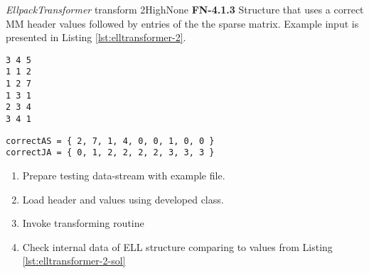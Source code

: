 \begin{testcase}{\emph{EllpackTransformer} transform 2}{High}{None}
	{
		\textbf{FN-4.1.3}
	}
	{
		Structure that uses a correct \gls{MM} header values followed by entries of the the sparse matrix. Example input is presented in Listing \ref{lst:elltransformer-2}. 	
	}
	\begin{lstlisting}[label={lst:elltransformer-2},
	basicstyle=\small,caption={\gls{MM} format data example}, frame=single]
%%MatrixMarket matrix coordinate real general
3 4 5
1 1 2
1 2 7
1 3 1
2 3 4
3 4 1
	\end{lstlisting}
	\begin{lstlisting}[label={lst:elltransformer-2-sol},
	basicstyle=\small,caption={\gls{ELL} format internal data example}, frame=single]
correctAS = { 2, 7, 1, 4, 0, 0, 1, 0, 0 }
correctJA = { 0, 1, 2, 2, 2, 2, 3, 3, 3 }
	\end{lstlisting}
	{
		\begin{enumerate}
			\item Prepare testing data-stream with example file.
			\item Load header and values using developed class.
			\item Invoke transforming routine 
			\item
			{
				Check internal data of \gls{ELL} structure comparing to values from Listing \ref{lst:elltransformer-2-sol} 
			}
		\end{enumerate}
	}
\end{testcase}